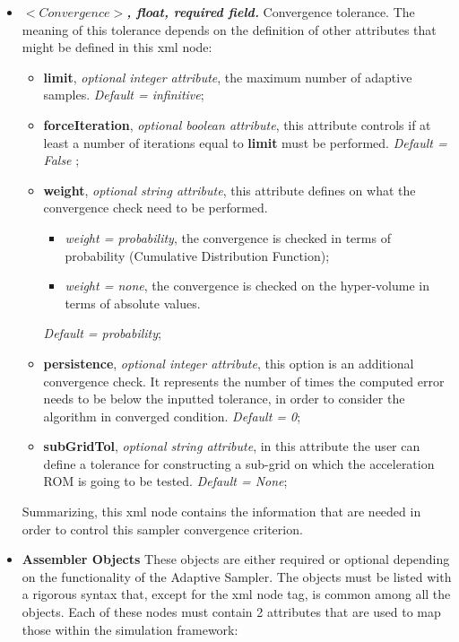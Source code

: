 \begin{itemize}
  \item $<Convergence>$\textbf{\textit{, float, required field.}} Convergence tolerance. The meaning of this tolerance depends on the definition of other attributes that might be defined in this xml node:
     \begin{itemize}
         \item \textbf{limit}, \textit{optional integer attribute}, the maximum number of adaptive samples. \textit{Default = infinitive};
         \item \textbf{forceIteration}, \textit{optional boolean attribute}, this attribute controls if at least a number of iterations equal to \textbf{limit} must be performed.  \textit{Default = False} ;
         \item \textbf{weight}, \textit{optional string attribute}, this attribute defines on what the convergence check need to be performed.
          \begin{itemize}
             \item \textit{weight = probability}, the convergence is checked in terms of probability (Cumulative Distribution Function);
             \item \textit{weight = none}, the convergence is checked on the hyper-volume in terms of absolute values.
          \end{itemize} 
          \textit{Default = probability};
         \item \textbf{persistence}, \textit{optional integer attribute}, this option is an additional convergence check. It represents the number of times the computed error needs to be below the inputted tolerance, in order to consider the algorithm in converged condition.  \textit{Default = 0};
         \item \textbf{subGridTol}, \textit{optional string attribute}, in this attribute the user can define a tolerance for constructing a sub-grid on which the acceleration ROM is going to be tested. \textit{Default = None};
      \end{itemize}   
   Summarizing,  this xml node contains the information that are needed in order to control this sampler convergence criterion.
   \item \textbf{Assembler Objects} These objects are either required or optional depending on the functionality of the Adaptive Sampler. The objects must be listed with a rigorous syntax that, except for the xml node tag, is common among all the objects.  
Each of these nodes  must contain 2 attributes that are used to map those within the simulation framework:

\end{itemize}
